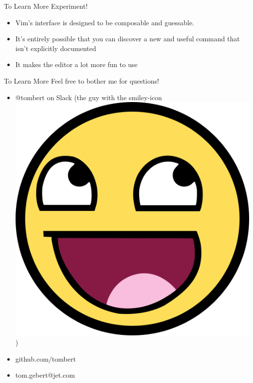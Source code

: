 \documentclass{beamer}
\begin{document}
\begin{frame}{To Learn More}
	Experiment!
	\begin{itemize}
		\item Vim's interface is designed to be composable and guessable.  
		\item It's entirely possible that you can discover a new and useful command that isn't explicitly documented
		\item It makes the editor a lot more fun to use
	\end{itemize}
\end{frame}

\begin{frame}{To Learn More}
	Feel free to bother me for questions!  
	\begin{itemize}
		\item @tombert on Slack (the guy with the smiley-icon \includegraphics[scale=.006]{awesome.jpg})
		\item github.com/tombert
		\item tom.gebert@jet.com
	\end{itemize}
\end{frame}
\end{document}
